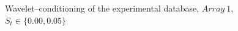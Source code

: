 \documentclass[english]{aiaa-tc}
\begin{document}
\begin{figure}[!ht]
\begin{center}
\begin{centering}
\end{centering}
\caption{Wavelet--conditioning of the experimental database, $Array~1$, $S_t \in \{0.00, 0.05\}$}
\label{fig:experimentalConditioning1}
\end{center}
\end{figure}
\end{document}
